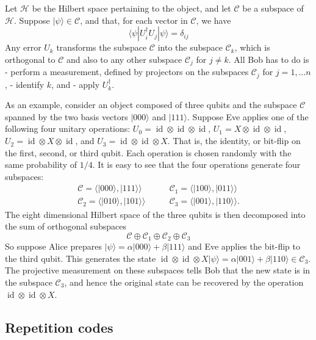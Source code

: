 \documentclass{article}
\begin{document}
Let \(\mathcal{H}\) be the Hilbert space pertaining to the object, and let \(\mathcal{C}\) be a subspace of \(\mathcal{H}\).
Suppose \(|\psi\rangle\in\mathcal{C}\), and that, for each vector in \(\mathcal{C}\), we have
\[
  \langle\psi|U^\dagger_i U_j|\psi\rangle = \delta_{ij}
\]
Any error \(U_k\) transforms the subspace \(\mathcal{C}\) into the subspace \(\mathcal{C}_k\), which is orthogonal to \(\mathcal{C}\) and also to any other subspace \(\mathcal{C}_j\) for \(j\neq k\).
All Bob has to do is
- perform a measurement, defined by projectors on the subspaces \(\mathcal{C}_j\) for \(j=1,\ldots n\),
- identify \(k\), and
- apply \(U_k^\dagger\).

As an example, consider an object composed of three qubits and the subspace \(\mathcal{C}\) spanned by the two basis vectors \(|000\rangle\) and \(|111\rangle\).
Suppose Eve applies one of the following four unitary operations: \(U_0=\operatorname{id}\otimes\operatorname{id}\otimes \operatorname{id}\), \(U_1 =X\otimes\operatorname{id}\otimes \operatorname{id}\), \(U_2 =\operatorname{id}\otimes X\otimes \operatorname{id}\), and \(U_3=\operatorname{id}\otimes\operatorname{id}\otimes X\).
That is, the identity, or bit-flip on the first, second, or third qubit.
Each operation is chosen randomly with the same probability of \(1/4\).
It is easy to see that the four operations generate four subspaces:
\[
  \begin{aligned}
    \mathcal{C} = \Big\langle|000\rangle,|111\rangle\Big\rangle &\qquad \mathcal{C}_1 = \Big\langle|100\rangle,|011\rangle\Big\rangle
  \\\mathcal{C}_2 = \Big\langle|010\rangle,|101\rangle\Big\rangle& \qquad \mathcal{C}_3 = \Big\langle|001\rangle,|110\rangle\Big\rangle.
  \end{aligned}
\]
The eight dimensional Hilbert space of the three qubits is then decomposed into the sum of orthogonal subspaces
\[
\mathcal{C} \oplus \mathcal{C}_1 \oplus\mathcal{C}_2 \oplus \mathcal{C}_3
\]
So suppose Alice prepares \(|\psi\rangle=\alpha|000\rangle+\beta|111\rangle\) and Eve applies the bit-flip to the third qubit.
This generates the state \(\operatorname{id}\otimes\operatorname{id}\otimes X|\psi\rangle=\alpha|001\rangle+\beta|110\rangle\in \mathcal{C}_3\).
The projective measurement on these subspaces tells Bob that the new state is in the subspace \(\mathcal{C}_3\), and hence the original state can be recovered by the operation \(\operatorname{id}\otimes\operatorname{id}\otimes X\).

\hypertarget{repetition-codes}{%
\subsection{Repetition codes}\label{repetition-codes}}
\end{document}
